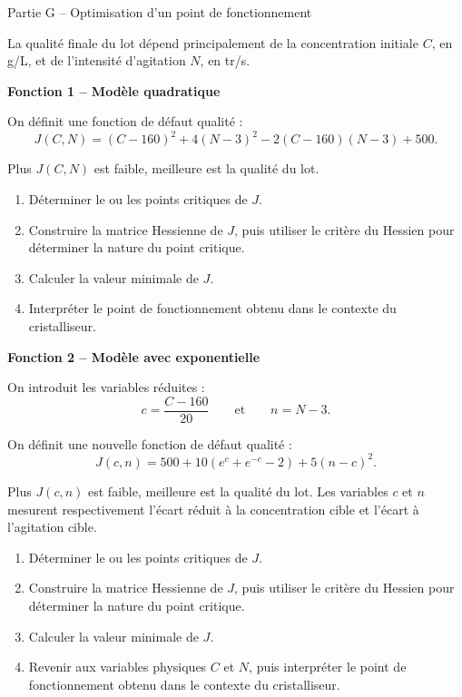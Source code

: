\documentclass[10pt,a4paper]{article}
\begin{document}
\begin{partbox}{Partie G -- Optimisation d'un point de fonctionnement}
	
	La qualité finale du lot dépend principalement de la concentration initiale $C$, en g/L, et de l'intensité d'agitation $N$, en tr/s.
	
	\medskip
	
	\textbf{Fonction 1 -- Modèle quadratique}
	
	On définit une fonction de défaut qualité :
	\[
	J(C,N)=(C-160)^2+4(N-3)^2-2(C-160)(N-3)+500.
	\]
	
	\begin{databox}
		Plus $J(C,N)$ est faible, meilleure est la qualité du lot.
	\end{databox}
	
	\begin{enumerate}
		\item Déterminer le ou les points critiques de $J$.
		
		\item Construire la matrice Hessienne de $J$, puis utiliser le critère du Hessien pour déterminer la nature du point critique.
		
		\item Calculer la valeur minimale de $J$.
		
		\item Interpréter le point de fonctionnement obtenu dans le contexte du cristalliseur.
	\end{enumerate}
	
	\medskip
	
	\textbf{Fonction 2 -- Modèle avec exponentielle}
	
	On introduit les variables réduites :
	\[
	c=\frac{C-160}{20}
	\qquad\text{et}\qquad
	n=N-3.
	\]
	
	On définit une nouvelle fonction de défaut qualité :
	\[
	J(c,n)=500+10\left(e^c+e^{-c}-2\right)+5(n-c)^2.
	\]
	
	\begin{databox}
		Plus $J(c,n)$ est faible, meilleure est la qualité du lot. Les variables $c$ et $n$ mesurent respectivement l'écart réduit à la concentration cible et l'écart à l'agitation cible.
	\end{databox}
	
	\begin{enumerate}
		\item Déterminer le ou les points critiques de $J$.
		
		\item Construire la matrice Hessienne de $J$, puis utiliser le critère du Hessien pour déterminer la nature du point critique.
		
		\item Calculer la valeur minimale de $J$.
		
		\item Revenir aux variables physiques $C$ et $N$, puis interpréter le point de fonctionnement obtenu dans le contexte du cristalliseur.
	\end{enumerate}
	
\end{partbox}
	
\end{document}

